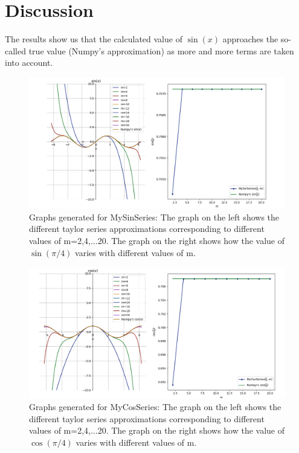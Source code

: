 \documentclass[12pt]{article}
\begin{document}
\section[]{Discussion}
The results show us that the calculated value of $\sin(x)$ approaches the so-called true value (Numpy's approximation) as more and more terms are taken into account.   
\begin{figure}[H]
	\centering
	\includegraphics[width=\linewidth]{graph1}
	\caption[Graphs generated for MySinSeries]{\small Graphs generated for MySinSeries: The graph on the left shows the different taylor series approximations corresponding to different values of m=2,4,...20. The graph on the right shows how the value of $\sin(\pi/4)$ varies with different values of m.}
	\label{fig:graph1}
\end{figure}
\begin{figure}[H]
	\centering
	\includegraphics[width=\linewidth]{graph2}
	\caption[Graphs generated for MyCosSeries]{\small Graphs generated for MyCosSeries: The graph on the left shows the different taylor series approximations corresponding to different values of m=2,4,...20. The graph on the right shows how the value of $\cos(\pi/4)$ varies with different values of m.}
	\label{fig:graph2}
\end{figure}
\end{document}

